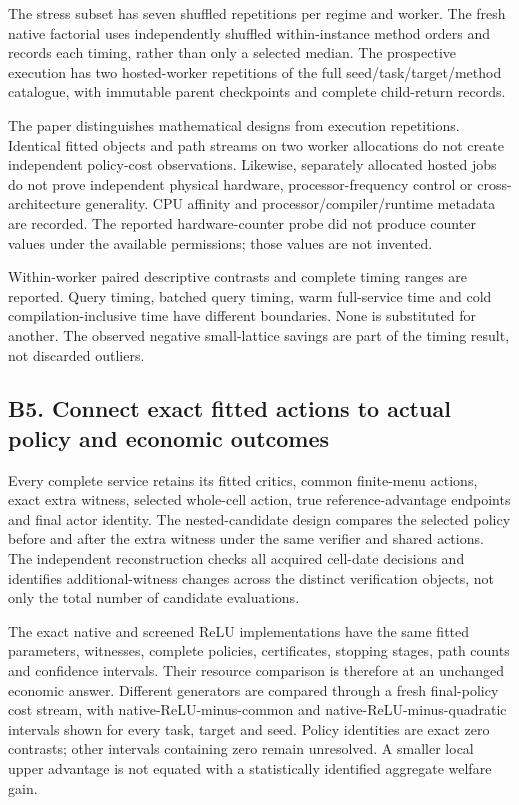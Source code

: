 \documentclass[ecta,nameyear,draft]{econsocart}
\begin{document}
The stress subset has seven shuffled repetitions per regime and worker.
The fresh native factorial uses independently shuffled within-instance
method orders and records each timing, rather than only a selected
median. The prospective execution has two hosted-worker repetitions of
the full seed/task/target/method catalogue, with immutable parent
checkpoints and complete child-return records.

The paper distinguishes mathematical designs from execution repetitions.
Identical fitted objects and path streams on two worker allocations do
not create independent policy-cost observations. Likewise, separately
allocated hosted jobs do not prove independent physical hardware,
processor-frequency control or cross-architecture generality. CPU
affinity and processor/compiler/runtime metadata are recorded. The
reported hardware-counter probe did not produce counter values under the
available permissions; those values are not invented.

Within-worker paired descriptive contrasts and complete timing ranges
are reported. Query timing, batched query timing, warm full-service time
and cold compilation-inclusive time have different boundaries. None is
substituted for another. The observed negative small-lattice savings are
part of the timing result, not discarded outliers.

\hypertarget{b5.-connect-exact-fitted-actions-to-actual-policy-and-economic-outcomes}{%
\subsection{B5. Connect exact fitted actions to actual policy and
economic
outcomes}\label{b5.-connect-exact-fitted-actions-to-actual-policy-and-economic-outcomes}}

Every complete service retains its fitted critics, common finite-menu
actions, exact extra witness, selected whole-cell action, true
reference-advantage endpoints and final actor identity. The
nested-candidate design compares the selected policy before and after
the extra witness under the same verifier and shared actions. The
independent reconstruction checks all acquired cell-date decisions and
identifies additional-witness changes across the distinct verification
objects, not only the total number of candidate evaluations.

The exact native and screened ReLU implementations have the same fitted
parameters, witnesses, complete policies, certificates, stopping stages,
path counts and confidence intervals. Their resource comparison is
therefore at an unchanged economic answer. Different generators are
compared through a fresh final-policy cost stream, with
native-ReLU-minus-common and native-ReLU-minus-quadratic intervals shown
for every task, target and seed. Policy identities are exact zero
contrasts; other intervals containing zero remain unresolved. A smaller
local upper advantage is not equated with a statistically identified
aggregate welfare gain.
\end{document}
